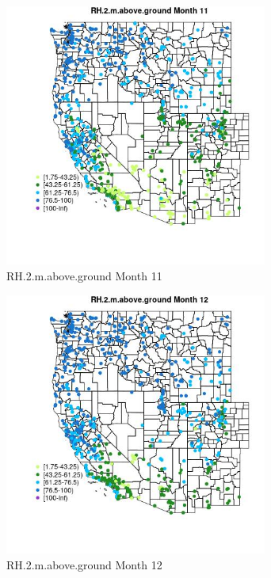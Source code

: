 \begin{figure} 
\centering  
\includegraphics[width=0.77\textwidth]{Code_Outputs/Report_ML_input_PM25_Step4_part_f_de_duplicated_aveswNAs_MapObsMo11RH2maboveground.jpg} 
\caption{\label{fig:Report_ML_input_PM25_Step4_part_f_de_duplicated_aveswNAsMapObsMo11RH2maboveground}RH.2.m.above.ground Month 11} 
\end{figure} 
 

\begin{figure} 
\centering  
\includegraphics[width=0.77\textwidth]{Code_Outputs/Report_ML_input_PM25_Step4_part_f_de_duplicated_aveswNAs_MapObsMo12RH2maboveground.jpg} 
\caption{\label{fig:Report_ML_input_PM25_Step4_part_f_de_duplicated_aveswNAsMapObsMo12RH2maboveground}RH.2.m.above.ground Month 12} 
\end{figure} 
 

